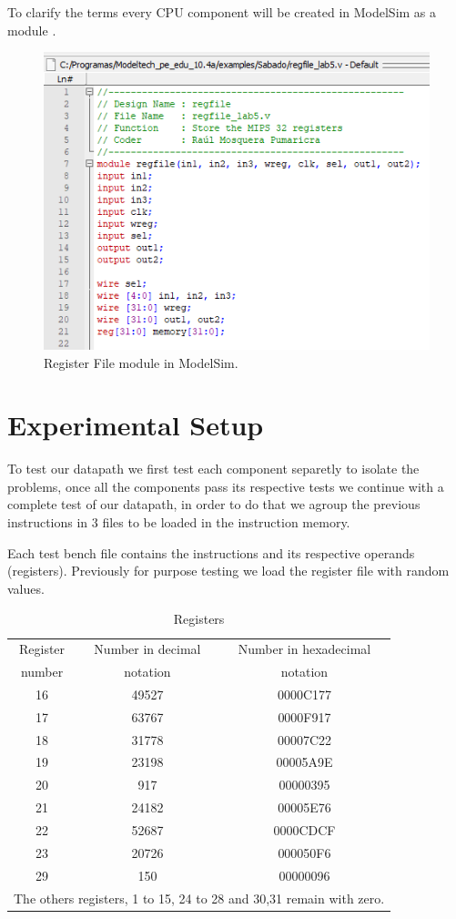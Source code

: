 \documentclass[conference]{IEEEtran}
\begin{document}
To clarify the terms every CPU component will be created in ModelSim as a module \cite{b4}.

\begin{figure}[htbp]
\centerline{\includegraphics[scale=0.7]{modelsim_module.png}}
\caption{Register File module in ModelSim.}
\label{fig}
\end{figure}

\section{Experimental Setup} %
To test our datapath we first test each component separetly to isolate the
problems, once all the components pass its respective tests we continue with a complete 
test of our datapath, in order to do that we agroup the previous instructions
in 3 files to be loaded in the instruction memory.

Each test bench file contains the instructions and its respective
operands (registers). Previously for purpose testing we load the 
register file with random values.

\begin{table}[htbp]
\caption{Registers} %
\begin{center}
\begin{tabular}{|c|c|c|}
\hline
Register&Number in decimal&Number in hexadecimal\\
number&notation&notation\\
\hline
16&49527&0000C177\\
\hline
17&63767&0000F917\\
\hline
18&31778&00007C22\\
\hline
19&23198&00005A9E\\
\hline
20&917&00000395\\
\hline
21&24182&00005E76\\
\hline
22&52687&0000CDCF\\
\hline
23&20726&000050F6\\
\hline
29&150&00000096\\
\hline
\multicolumn{3}{l}{The others registers, 1 to 15, 24 to 28 and 30,31 remain with zero.}
\end{tabular}
\label{tab_regfile}
\end{center}
\end{table}
\end{document}
